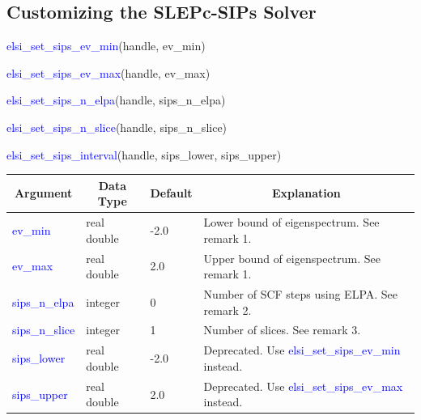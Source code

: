 \documentclass{report}
\begin{document}
\subsection{Customizing the SLEPc-SIPs Solver}
\label{subsec:setter_sips}
\begin{labeling}{\hspace{6cm}}
\item [\hspace{0.3cm} \textcolor{blue}{elsi\_set\_sips\_ev\_min}(handle, ev\_min)]
\item [\hspace{0.3cm} \textcolor{blue}{elsi\_set\_sips\_ev\_max}(handle, ev\_max)]
\item [\hspace{0.3cm} \textcolor{blue}{elsi\_set\_sips\_n\_elpa}(handle, sips\_n\_elpa)]
\item [\hspace{0.3cm} \textcolor{blue}{elsi\_set\_sips\_n\_slice}(handle, sips\_n\_slice)]
\item [\hspace{0.3cm} \textcolor{blue}{elsi\_set\_sips\_interval}(handle, sips\_lower, sips\_upper)]
\end{labeling}

\begin{tabular}[]{|p{30mm}|p{20mm}|p{15mm}|p{100mm}|}
\hline
\multicolumn{1}{|c|}{\textbf{Argument}} & \multicolumn{1}{c|}{\textbf{Data Type}} & \multicolumn{1}{c|}{\textbf{Default}} & \multicolumn{1}{c|}{\textbf{Explanation}}\\
\hline
\textcolor{blue}{ev\_min}        & real double & -2.0 & Lower bound of eigenspectrum.  See remark 1.\\
\hline
\textcolor{blue}{ev\_max}        & real double & 2.0  & Upper bound of eigenspectrum.  See remark 1.\\
\hline
\textcolor{blue}{sips\_n\_elpa}  & integer     & 0    & Number of SCF steps using ELPA.  See remark 2.\\
\hline
\textcolor{blue}{sips\_n\_slice} & integer     & 1    & Number of slices.  See remark 3.\\
\hline
\textcolor{blue}{sips\_lower}    & real double & -2.0 & Deprecated.  Use \textcolor{blue}{elsi\_set\_sips\_ev\_min} instead.\\
\hline
\textcolor{blue}{sips\_upper}    & real double & 2.0  & Deprecated.  Use \textcolor{blue}{elsi\_set\_sips\_ev\_max} instead.\\
\hline
\end{tabular}
\end{document}
